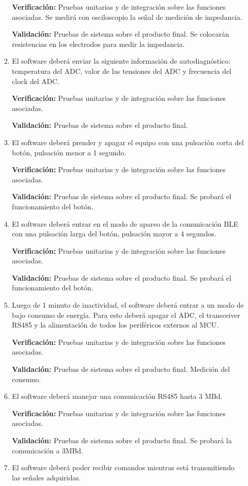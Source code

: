 \documentclass[
11pt, %
codirector, %
]{charter}
\begin{document}
\begin{enumerate}
\begin{enumerate}
			\textbf{Verificación:} Pruebas unitarias y de integración sobre las funciones asociadas. Se medirá con osciloscopio la señal de medición de impedancia.
			
			\textbf{Validación:}  Pruebas de sistema sobre el producto final. Se colocarán resistencias en los electrodos para medir la impedancia.
			\item El software deberá enviar la siguiente información de autodiagnóstico: temperatura del ADC, valor de las tensiones del ADC y frecuencia del clock del ADC.
			
			\textbf{Verificación:} Pruebas unitarias y de integración sobre las funciones asociadas.
			
			\textbf{Validación:}  Pruebas de sistema sobre el producto final.
			\item El software deberá prender y apagar el equipo con una pulsación corta del botón, pulsación menor a 1 segundo.
			
			\textbf{Verificación:} Pruebas unitarias y de integración sobre las funciones asociadas.
			
			\textbf{Validación:} Pruebas de sistema sobre el producto final. Se probará el funcionamiento del botón.
			\item El software deberá entrar en el modo de apareo de la comunicación BLE con una pulsación larga del botón, pulsación mayor a 4 segundos.
			
			\textbf{Verificación:} Pruebas unitarias y de integración sobre las funciones asociadas.
			
			\textbf{Validación:} Pruebas de sistema sobre el producto final. Se probará el funcionamiento del botón.
			\item Luego de 1 minuto de inactividad, el software deberá entrar a un modo de bajo consumo de energía. Para esto deberá apagar el ADC, el transceiver RS485 y la alimentación de todos los periféricos externos al MCU.
			
			\textbf{Verificación:} Pruebas unitarias y de integración sobre las funciones asociadas.
			
			\textbf{Validación:} Pruebas de sistema sobre el producto final. Medición del consumo.
			\item El software deberá manejar una comunicación RS485 hasta 3 MBd.
			
			\textbf{Verificación:} Pruebas unitarias y de integración sobre las funciones asociadas.
			
			\textbf{Validación:} Pruebas de sistema sobre el producto final. Se probará la comunicación a 3MBd.
			\item El software deberá poder recibir comandos mientras está transmitiendo las señales adquiridas.
			

\end{enumerate}
\end{enumerate}
\end{document}

